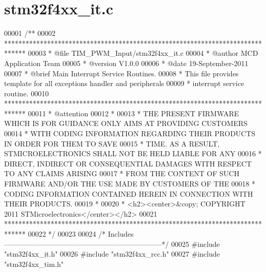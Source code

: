 \section{stm32f4xx\+\_\+it.\+c}
\label{stm32f4xx__it_8c_source}

\begin{DoxyCode}
00001 \textcolor{comment}{/**}
00002 \textcolor{comment}{  ******************************************************************************}
00003 \textcolor{comment}{  * @file    TIM\_PWM\_Input/stm32f4xx\_it.c }
00004 \textcolor{comment}{  * @author  MCD Application Team}
00005 \textcolor{comment}{  * @version V1.0.0}
00006 \textcolor{comment}{  * @date    19-September-2011}
00007 \textcolor{comment}{  * @brief   Main Interrupt Service Routines.}
00008 \textcolor{comment}{  *          This file provides template for all exceptions handler and peripherals}
00009 \textcolor{comment}{  *          interrupt service routine.}
00010 \textcolor{comment}{  ******************************************************************************}
00011 \textcolor{comment}{  * @attention}
00012 \textcolor{comment}{  *}
00013 \textcolor{comment}{  * THE PRESENT FIRMWARE WHICH IS FOR GUIDANCE ONLY AIMS AT PROVIDING CUSTOMERS}
00014 \textcolor{comment}{  * WITH CODING INFORMATION REGARDING THEIR PRODUCTS IN ORDER FOR THEM TO SAVE}
00015 \textcolor{comment}{  * TIME. AS A RESULT, STMICROELECTRONICS SHALL NOT BE HELD LIABLE FOR ANY}
00016 \textcolor{comment}{  * DIRECT, INDIRECT OR CONSEQUENTIAL DAMAGES WITH RESPECT TO ANY CLAIMS ARISING}
00017 \textcolor{comment}{  * FROM THE CONTENT OF SUCH FIRMWARE AND/OR THE USE MADE BY CUSTOMERS OF THE}
00018 \textcolor{comment}{  * CODING INFORMATION CONTAINED HEREIN IN CONNECTION WITH THEIR PRODUCTS.}
00019 \textcolor{comment}{  *}
00020 \textcolor{comment}{  * <h2><center>&copy; COPYRIGHT 2011 STMicroelectronics</center></h2>}
00021 \textcolor{comment}{  ******************************************************************************}
00022 \textcolor{comment}{  */}
00023 
00024 \textcolor{comment}{/* Includes ------------------------------------------------------------------*/}
00025 \textcolor{preprocessor}{#}\textcolor{preprocessor}{include} "stm32f4xx_it.h"
00026 \textcolor{preprocessor}{#}\textcolor{preprocessor}{include} "stm32f4xx_rcc.h"
00027 \textcolor{preprocessor}{#}\textcolor{preprocessor}{include} "stm32f4xx_tim.h"

\end{DoxyCode}
